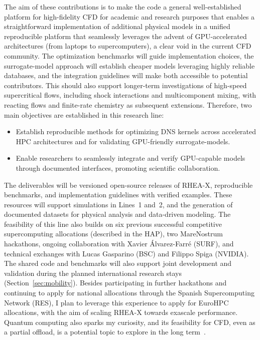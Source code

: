 \documentclass[11pt]{article}
\begin{document}
The aim of these contributions is to make the code a general well-established platform for high-fidelity CFD for academic and research purposes that enables a straightforward implementation of additional physical models in a unified reproducible platform that seamlessly leverages the advent of GPU-accelerated architectures (from laptops to supercomputers), a clear void in the current CFD community. 
The optimization benchmarks will guide implementation choices, the surrogate-model approach will establish cheaper models leveraging highly reliable databases, and the integration guidelines will make both accessible to potential contributors. 
This should also support longer-term investigations of high-speed supercritical flows, including shock interactions and multicomponent mixing, with reacting flows and finite-rate chemistry as subsequent extensions.
Therefore, two main objectives are established in this research line:
\begin{itemize}
	\item[\textbf{O7.}] Establish reproducible methods for optimizing DNS kernels across accelerated HPC architectures and for validating GPU-friendly surrogate-models.
	\item[\textbf{O8.}] Enable researchers to seamlessly integrate and verify GPU-capable models through documented interfaces, promoting scientific collaboration.
\end{itemize}

The deliverables will be versioned open-source releases of RHEA-X, reproducible benchmarks, and implementation guidelines with verified examples. 
These resources will support simulations in Lines~1 and~2, and the generation of documented datasets for physical analysis and data-driven modeling. 
The feasibility of this line also builds on six previous successful competitive supercomputing allocations (described in the HAP), two MareNostrum hackathons, ongoing collaboration with Xavier Álvarez-Farré (SURF), and technical exchanges with Lucas Gasparino (BSC) and Filippo Spiga (NVIDIA). 
The shared code and benchmarks will also support joint development and validation during the planned international research stays (Section~\ref{sec:mobility}).
Besides participating in further hackathons and continuing to apply for national allocations through the Spanish Supercomputing Network (RES), I plan to leverage this experience to apply for EuroHPC allocations, with the aim of scaling RHEA-X towards exascale performance.
Quantum computing also sparks my curiosity, and its feasibility for CFD, even as a partial offload, is a potential topic to explore in the long term~\cite{Bharadwaj2023}.
\end{document}

